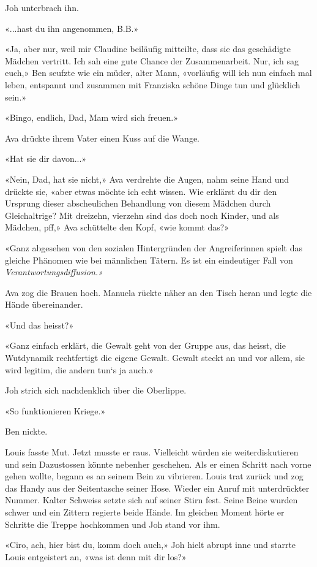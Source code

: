 Joh unterbrach ihn.

«...hast du ihn angenommen, B.B.»

«Ja, aber nur, weil mir Claudine beiläufig mitteilte, dass sie das
geschädigte Mädchen vertritt. Ich sah eine gute Chance der
Zusammenarbeit. Nur, ich sag euch,» Ben seufzte wie ein müder, alter
Mann, «vorläufig will ich nun einfach mal leben, entspannt und zusammen
mit Franziska schöne Dinge tun und glücklich sein.»

«Bingo, endlich, Dad, Mam wird sich freuen.»

Ava drückte ihrem Vater einen Kuss auf die Wange.

«Hat sie dir davon...»

«Nein, Dad, hat sie nicht,» Ava verdrehte die Augen, nahm seine Hand und
drückte sie, «aber etwas möchte ich echt wissen. Wie erklärst du dir den
Ursprung dieser abscheulichen Behandlung von diesem Mädchen durch
Gleichaltrige? Mit dreizehn, vierzehn sind das doch noch Kinder, und als
Mädchen, pff,» Ava schüttelte den Kopf, «wie kommt das?»

«Ganz abgesehen von den sozialen Hintergründen der Angreiferinnen spielt
das gleiche Phänomen wie bei männlichen Tätern. Es ist ein eindeutiger
Fall von \emph{Verantwortungsdiffusion.»}

Ava zog die Brauen hoch. Manuela rückte näher an den Tisch heran und
legte die Hände übereinander.

«Und das heisst?»

«Ganz einfach erklärt, die Gewalt geht von der Gruppe aus, das heisst,
die Wutdynamik rechtfertigt die eigene Gewalt. Gewalt steckt an und vor
allem, sie wird legitim, die andern tun`s ja auch.»

Joh strich sich nachdenklich über die Oberlippe.

«So funktionieren Kriege.»

Ben nickte.

Louis fasste Mut. Jetzt musste er raus. Vielleicht würden sie
weiterdiskutieren und sein Dazustossen könnte nebenher geschehen. Als er
einen Schritt nach vorne gehen wollte, begann es an seinem Bein zu
vibrieren. Louis trat zurück und zog das Handy aus der Seitentasche
seiner Hose. Wieder ein Anruf mit unterdrückter Nummer. Kalter Schweiss
setzte sich auf seiner Stirn fest. Seine Beine wurden schwer und ein
Zittern regierte beide Hände. Im gleichen Moment hörte er Schritte die
Treppe hochkommen und Joh stand vor ihm.

«Ciro, ach, hier bist du, komm doch auch,» Joh hielt abrupt inne und
starrte Louis entgeistert an, «was ist denn mit dir los?»

